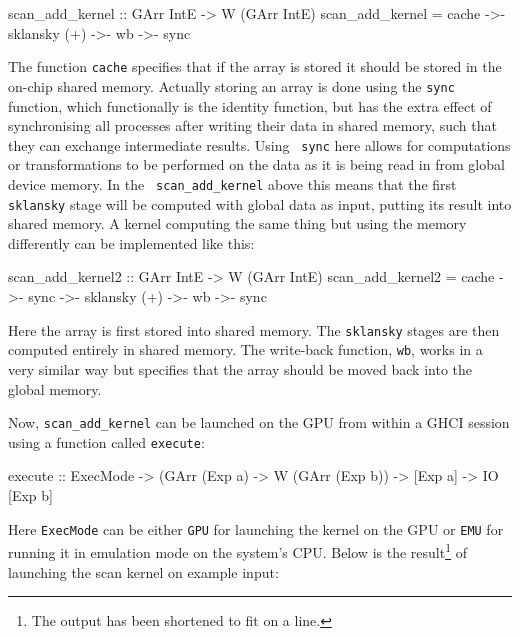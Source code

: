 \begin{code}
scan_add_kernel :: GArr IntE -> W (GArr IntE) 
scan_add_kernel = cache ->- sklansky (+) ->- wb ->- sync
\end{code}
The function {\tt cache} specifies that if the array is stored it should be
stored in the on-chip shared memory. Actually storing an array is done using
the {\tt sync} function, which functionally is the identity function, but has
the extra effect of synchronising all processes after writing their data in
shared memory, such that they can exchange intermediate results. Using {\tt
sync} here allows for computations or transformations to be performed on the
data as it is being read in from global device memory. In the {\tt
scan\_add\_kernel} above this means that the first {\tt sklansky} stage will
be computed with global data as input, putting its result into shared memory.
A kernel computing the same thing but using the memory differently can be
implemented like this:
\begin{code}
scan_add_kernel2 :: GArr IntE -> W (GArr IntE) 
scan_add_kernel2 = cache ->- sync ->- sklansky (+) ->- wb ->- 
                     sync
\end{code}
Here the array is first stored into shared memory. The {\tt sklansky} stages
are then computed entirely in shared memory. The write-back function, {\tt wb}, 
works in a very similar way but specifies that the array should be moved back 
into the global memory. 

Now, {\tt scan\_add\_kernel} can be launched on the GPU from within a GHCI 
session using a function called {\tt execute}:

\begin{code}
execute :: ExecMode -> (GArr (Exp a) -> W (GArr (Exp b)) -> 
              [Exp a] -> IO [Exp b]
\end{code}
Here {\tt ExecMode} can be either {\tt GPU} for launching the kernel on the 
GPU or {\tt EMU} for running it in emulation mode on the system's CPU. Below is 
the result\footnote{The output has been shortened to fit on a line.} of 
launching the scan kernel on example input:

